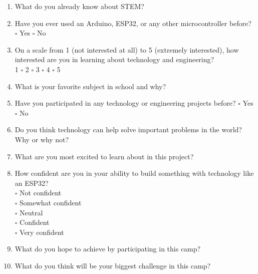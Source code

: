 \documentclass{article}
\begin{document}
\begin{enumerate}
    \item What do you already know about STEM?
    \vspace{30mm}
    \item Have you ever used an Arduino, ESP32, or any other microcontroller before? $\square$ Yes $\square$ No
    \vspace{10mm}
    \item On a scale from 1 (not interested at all) to 5 (extremely interested), how interested are you in learning about technology and engineering? \\
          1 $\square$ 2 $\square$ 3 $\square$ 4 $\square$ 5
    \vspace{10mm}
    \item What is your favorite subject in school and why?
    \vspace{30mm}
    \item Have you participated in any technology or engineering projects before? $\square$ Yes $\square$ No
    \vspace{10mm}
    \newpage
    \item Do you think technology can help solve important problems in the world? Why or why not?
    \vspace{30mm}
    \item What are you most excited to learn about in this project?
    \vspace{10mm}
    \item How confident are you in your ability to build something with technology like an ESP32? \\
          $\square$ Not confident \\
          $\square$ Somewhat confident \\
          $\square$ Neutral \\
          $\square$ Confident \\
          $\square$ Very confident
    \vspace{10mm}
    \item What do you hope to achieve by participating in this camp?
    \vspace{30mm}
    \item What do you think will be your biggest challenge in this camp?
    
\end{enumerate}
\end{document}
